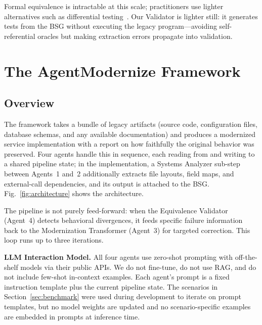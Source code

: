 \documentclass[conference]{IEEEtran}
\begin{document}
Formal equivalence is intractable at this scale; practitioners use lighter alternatives such as differential testing~\cite{mckeeman1998differential}. Our Validator is lighter still: it generates tests from the BSG without executing the legacy program---avoiding self-referential oracles but making extraction errors propagate into validation.

\section{The AgentModernize Framework}

\subsection{Overview}

The framework takes a bundle of legacy artifacts (source code, configuration files, database schemas, and any available documentation) and produces a modernized service implementation with a report on how faithfully the original behavior was preserved. Four agents handle this in sequence, each reading from and writing to a shared pipeline state; in the implementation, a Systems Analyzer sub-step between Agents~1 and~2 additionally extracts file layouts, field maps, and external-call dependencies, and its output is attached to the BSG. Fig.~\ref{fig:architecture} shows the architecture.

The pipeline is not purely feed-forward: when the Equivalence Validator (Agent~4) detects behavioral divergences, it feeds specific failure information back to the Modernization Transformer (Agent~3) for targeted correction. This loop runs up to three iterations.

\textbf{LLM Interaction Model.} All four agents use zero-shot prompting with off-the-shelf models via their public APIs. We do not fine-tune, do not use RAG, and do not include few-shot in-context examples. Each agent's prompt is a fixed instruction template plus the current pipeline state. The scenarios in Section~\ref{sec:benchmark} were used during development to iterate on prompt templates, but no model weights are updated and no scenario-specific examples are embedded in prompts at inference time.
\end{document}
